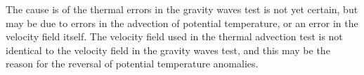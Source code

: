 The cause is of the thermal errors in the gravity waves test is not yet certain, but may be due to errors in the advection of potential temperature, or an error in the velocity field itself.  The velocity field used in the thermal advection test is not identical to the velocity field in the gravity waves test, and this may be the reason for the reversal of potential temperature anomalies.
